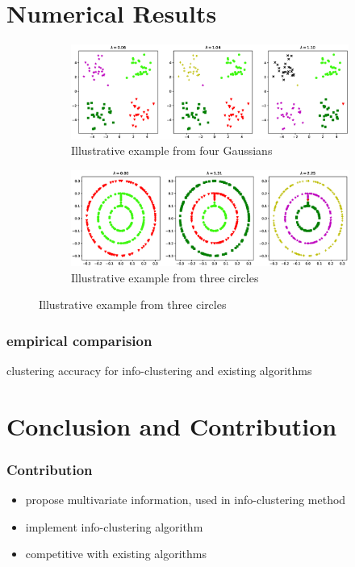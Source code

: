 \documentclass{beamer}
\begin{document}
\section{Numerical Results}
\begin{frame}
\begin{figure}[!ht]
\centering
\begin{subfigure}{\textwidth}
\includegraphics[width=12cm]{pic/4part.eps}
\caption{Illustrative example from four Gaussians}\label{fig:4p}
\end{subfigure}
\begin{subfigure}{\textwidth}
\includegraphics[width=12cm]{pic/3circle.eps}
\caption{Illustrative example from three circles}\label{fig:3c}
\end{subfigure}
\end{figure}
\end{frame}
\begin{frame}
\frametitle{empirical comparision}
\begin{table}[!ht]
\centering

\caption{clustering accuracy for info-clustering and existing algorithms}
\end{table}
\end{frame}
\section{Conclusion and Contribution}
\begin{frame}
\frametitle{Contribution}
\begin{itemize}
\item propose multivariate information, used in info-clustering method
\item implement info-clustering algorithm
\item competitive with existing algorithms
\end{itemize}
\end{frame}
\end{document}

